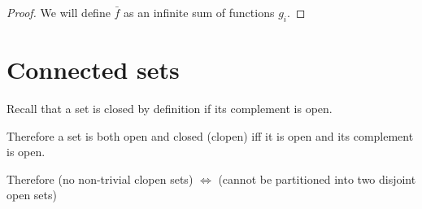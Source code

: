 \begin{proof}
  We will define $\bar f$ as an infinite sum of functions $g_i$.
\end{proof}


\section{Connected sets}

Recall that a set is closed by definition if its complement is open.

Therefore a set is both open and closed (clopen) iff it is open and its complement is open.

Therefore (no non-trivial clopen sets) $\iff$ (cannot be partitioned into two disjoint open sets)
